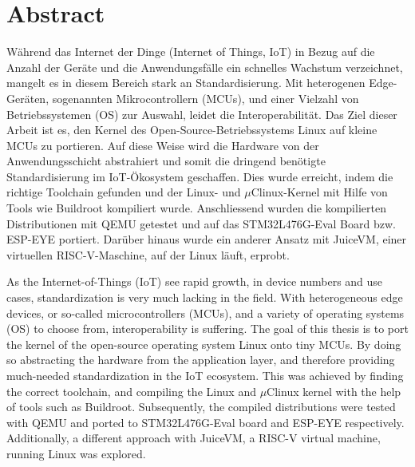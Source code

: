 \chapter*{Abstract}

W\"ahrend das Internet der Dinge (Internet of Things, IoT) in Bezug auf die Anzahl der Ger\"ate und die Anwendungsf\"alle ein schnelles Wachstum verzeichnet, mangelt es in diesem Bereich stark an Standardisierung. Mit heterogenen Edge-Ger\"aten, sogenannten Mikrocontrollern (MCUs), und einer Vielzahl von Betriebssystemen (OS) zur Auswahl, leidet die Interoperabilit\"at. Das Ziel dieser Arbeit ist es, den Kernel des Open-Source-Betriebssystems Linux auf kleine MCUs zu portieren. Auf diese Weise wird die Hardware von der Anwendungsschicht abstrahiert und somit die dringend ben\"otigte Standardisierung im IoT-\"Okosystem geschaffen. Dies wurde erreicht, indem die richtige Toolchain gefunden und der Linux- und $\mu$Clinux-Kernel mit Hilfe von Tools wie Buildroot kompiliert wurde.  Anschliessend wurden die kompilierten Distributionen mit QEMU getestet und auf das STM32L476G-Eval Board bzw. ESP-EYE portiert. Dar\"uber hinaus wurde ein anderer Ansatz mit JuiceVM, einer virtuellen RISC-V-Maschine, auf der Linux l\"auft, erprobt.



As the Internet-of-Things (IoT) see rapid growth, in device numbers and use cases, standardization is very much lacking in the field. With heterogeneous edge devices, or so-called microcontrollers (MCUs), and a variety of operating systems (OS) to choose from, interoperability is suffering. The goal of this thesis is to port the kernel of the open-source operating system Linux onto tiny MCUs. By doing so abstracting the hardware from the application layer, and therefore providing much-needed standardization in the IoT ecosystem. This was achieved by finding the correct toolchain, and compiling the Linux and $\mu$Clinux kernel with the help of tools such as Buildroot.  Subsequently, the compiled distributions were tested with QEMU and ported to STM32L476G-Eval board and ESP-EYE respectively. Additionally, a different approach with JuiceVM, a RISC-V virtual machine, running Linux was explored.